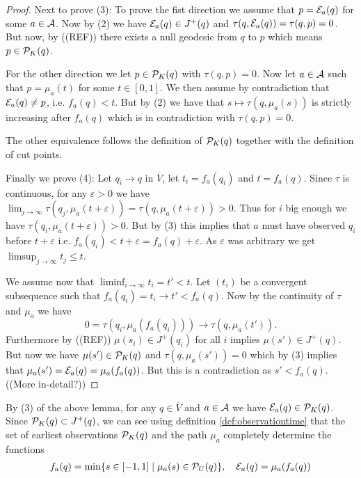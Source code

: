 \begin{proof}
Next to prove (3):
To prove the fist direction we assume that $p=\mc{E}_a(q)$ for some $a\in \mc{A}$. Now by (2) we have $\mc{E}_a(q) \in J^+(q)$ and $\tau(q,\mc{E}_a(q))=\tau(q,p)=0$. But now, by ((REF)) there exists a null geodesic from $q$ to $p$ which means $p\in \mc{P}_K(q)$. 

For the other direction we let $p\in \mc{P}_K(q)$ with $\tau(q,p)=0$. Now let $a\in \mc{A}$ such that $p=\mu_a(t)$ for some $t\in [0,1]$. We then assume by contradiction that $\mc{E}_a(q) \neq p$, i.e. $f_a(q) < t$. But by (2) we have that $s\mapsto\tau(q,\mu_a(s))$ is strictly increasing after $f_a(q)$ which is in contradiction with $\tau(q,p)=0$.

The other equivalence follows the definition of $\mc{P}_K(q)$ together with the definition of cut points.

Finally we prove (4):
Let $q_i\to q$ in $\overline{V}$, let $t_i = f_a(q_i)$ and $t=f_a(q)$. Since $\tau$ is continuous, for any $\varepsilon>0$ we have $\lim_{j\to \infty} \tau(q_j,\mu_a(t+\varepsilon)) = \tau(q,\mu_a(t+\varepsilon)) > 0$. Thus for $i$ big enough we have $\tau(q_i,\mu_a(t+\varepsilon))>0$. But by (3) this implies that $a$ must have observed $q_i$ before $t+\varepsilon$ i.e. $f_a(q_i)<t+\varepsilon = f_a(q) + \varepsilon$. As $\varepsilon$ was arbitrary we get $\limsup_{j\to \infty} t_j \leq t$.

We assume now that $\liminf_{i\to \infty} t_i=t'<t$. Let $(t_i)$ be a convergent subsequence such that $f_a(q_i) = t_i \to t' < f_a(q)$. Now by the continuity of $\tau$ and $\mu_a$ we have 
\[
0=\tau(q_i,\mu_a(f_a(q_i)))\to \tau(q,\mu_a(t')).
\]
Furthermore by ((REF)) $\mu(s_i)\in J^+(q_i)$ for all $i$ implies $\mu(s')\in J^+(q)$. But now we have $\mu(s')\in \mc{P}_K(q)$ and $\tau(q,\mu_a(s'))=0$ which by (3) implies that $\mu_a(s') = \mc{E}_a(q) = \mu_a(f_a(q))$. But this is a contradiction as $s'<f_a(q)$. ((More in-detail?))
\end{proof}

By (3) of the above lemma, for any $q\in \overline{V}$ and $a\in \ca$ we have $\mc{E}_a(q)\in \P_K(q)$. Since $\P_K(q)\subset J^+(q)$, we can see using definition \ref{def:observationtime} that the set of earliest observations $\P_K(q)$ and the path $\mu_a$ completely determine the functions
\begin{align}\label{eq:observationtimerestated}
    f_a(q) = \min \{ s\in [-1,1] \mid \mu_a(s)\in \P_U(q) \}, \quad \mc{E}_a(q) = \mu_a(f_a(q))
\end{align}

